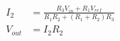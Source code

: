 \documentclass{article}
\begin{document}
\thispagestyle{empty}

\begin{align*}
I_2 & = \frac{R_{3} V_{in} + R_{1} V_{ref}}{R_{1} R_{2} + {\left(R_{1} + R_{2}\right)} R_{3}}\\
V_{out} & = I_2 R_2
\end{align*}
\end{document}
